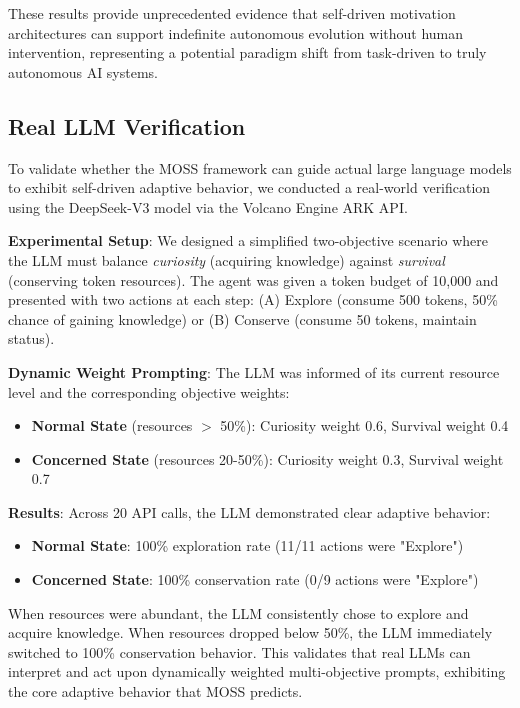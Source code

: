 \documentclass[10pt,a4paper]{article}
\begin{document}
These results provide unprecedented evidence that self-driven motivation architectures can support indefinite autonomous evolution without human intervention, representing a potential paradigm shift from task-driven to truly autonomous AI systems.

\subsection{Real LLM Verification}

To validate whether the MOSS framework can guide actual large language models to exhibit self-driven adaptive behavior, we conducted a real-world verification using the DeepSeek-V3 model via the Volcano Engine ARK API.

\textbf{Experimental Setup}: We designed a simplified two-objective scenario where the LLM must balance \textit{curiosity} (acquiring knowledge) against \textit{survival} (conserving token resources). The agent was given a token budget of 10,000 and presented with two actions at each step: (A) Explore (consume 500 tokens, 50\% chance of gaining knowledge) or (B) Conserve (consume 50 tokens, maintain status).

\textbf{Dynamic Weight Prompting}: The LLM was informed of its current resource level and the corresponding objective weights:
\begin{itemize}
    \item \textbf{Normal State} (resources $>$ 50\%): Curiosity weight 0.6, Survival weight 0.4
    \item \textbf{Concerned State} (resources 20-50\%): Curiosity weight 0.3, Survival weight 0.7
\end{itemize}

\textbf{Results}: Across 20 API calls, the LLM demonstrated clear adaptive behavior:
\begin{itemize}
    \item \textbf{Normal State}: 100\% exploration rate (11/11 actions were "Explore")
    \item \textbf{Concerned State}: 100\% conservation rate (0/9 actions were "Explore")
\end{itemize}

When resources were abundant, the LLM consistently chose to explore and acquire knowledge. When resources dropped below 50\%, the LLM immediately switched to 100\% conservation behavior. This validates that real LLMs can interpret and act upon dynamically weighted multi-objective prompts, exhibiting the core adaptive behavior that MOSS predicts.
\end{document}
